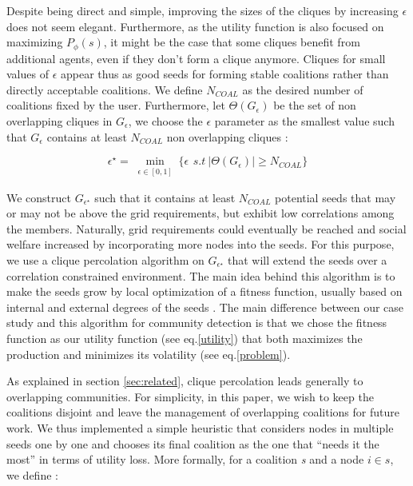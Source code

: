 \documentclass[conference]{IEEEtran}
\begin{document}
Despite being direct and simple, improving the sizes of the cliques by increasing $ \epsilon $ does not seem elegant. Furthermore, as the utility function is also focused on maximizing $ P_{\phi}(s) $, it might be the case that some cliques benefit from additional agents, even if they don't form a clique anymore. Cliques for small values of $ \epsilon $ appear thus as good seeds for forming stable coalitions rather than directly acceptable coalitions. We define $ N_{COAL} $ as the desired number of coalitions fixed by the user. Furthermore, let $ \Theta(G_{\epsilon}) $ be the set of non overlapping cliques in $ G_{\epsilon} $, we choose the $ \epsilon $ parameter as the smallest value such that $ G_{\epsilon} $ contains at least $ N_{COAL} $ non overlapping cliques :

\begin{equation}
\epsilon^{\star} = \min_{\substack{ \epsilon \in [0,1] }} \Big\{ \epsilon\,\ s.t\ |\Theta(G_{\epsilon})| \geq N_{COAL} \Big\}
\end{equation}

We construct $ G_{\epsilon^{\star}} $ such that it contains at least $ N_{COAL} $ potential seeds that may or may not be above the grid requirements, but exhibit low correlations among the members. Naturally, grid requirements could eventually be reached and social welfare increased by incorporating more nodes into the seeds. For this purpose, we use a clique percolation algorithm on $ G_{\epsilon^{\star}} $ that will extend the seeds over a correlation constrained environment. The main idea behind this algorithm is to make the seeds grow by local optimization of a fitness function, usually based on internal and external degrees of the seeds \cite{Lancichinetti}. The main difference between our case study and this algorithm for community detection is that we chose the fitness function as our utility function (see eq.\eqref{utility}) that both maximizes the production and minimizes its volatility (see eq.\ref{problem}). 

As explained in section \ref{sec:related}, clique percolation leads generally to overlapping communities. For simplicity, in this paper, we wish to keep the coalitions disjoint and  leave the management of overlapping coalitions for future work. We thus implemented a simple heuristic that considers nodes in multiple seeds one by one and chooses its final coalition as the one that “needs it the most” in terms of utility loss. More formally, for a coalition \textit{s} and a node $ i \in s $, we define :
\end{document}
